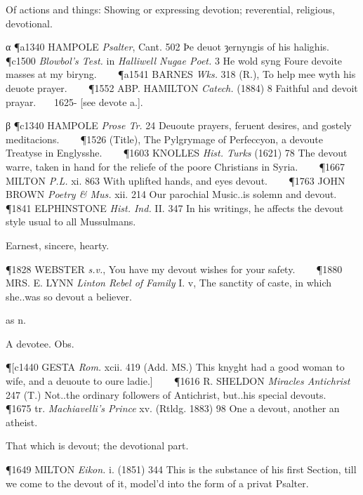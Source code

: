 \begin{description}[wide, labelwidth=!, labelindent=0pt]
\begin{myenumerate}
 Of actions and things: Showing or expressing devotion; reverential, religious, devotional.

α \P a1340 HAMPOLE  \textit{Psalter}, Cant. 502 Þe deuot ȝernyngis of his halighis.    
\P c1500 \textit{Blowbol's Test.} in  \textit{Halliwell Nugae Poet.} 3 He wold syng Foure devoite masses at my biryng.    
\P a1541 BARNES  \textit{Wks.} 318 (R.), To help mee wyth his deuote prayer.    
\P 1552 ABP. HAMILTON  \textit{Catech.} (1884) 8 Faithful and devoit prayar.    1625- [see devote a.].

β \P c1340 HAMPOLE  \textit{Prose Tr.} 24 Deuoute prayers, feruent desires, and gostely meditacions.    
\P 1526 (Title),  The Pylgrymage of Perfeccyon, a devoute Treatyse in Englysshe.    
\P 1603 KNOLLES  \textit{Hist. Turks} (1621) 78 The devout warre, taken in hand for the reliefe of the poore Christians in Syria.    
\P 1667 MILTON  \textit{P.L.} xi. 863 With uplifted hands, and eyes devout.    
\P 1763 JOHN  BROWN \textit{Poetry \& Mus.} xii. 214 Our parochial Music..is solemn and devout.    
\P 1841 ELPHINSTONE  \textit{Hist. Ind.} II. 347 In his writings, he affects the devout style usual to all Mussulmans.

 Earnest, sincere, hearty.

\P 1828 WEBSTER  \textit{s.v.}, You have my devout wishes for your safety.    
\P 1880 MRS. E. LYNN  \textit{Linton Rebel of Family} I. v, The sanctity of caste, in which she..was so devout a believer.

 as n.

 A devotee. Obs.

\P [c1440 GESTA  \textit{Rom.} xcii. 419 (Add. MS.) This knyght had a good woman to wife, and a deuoute to oure ladie.]    
\P 1616 R. SHELDON  \textit{Miracles Antichrist} 247 (T.) Not..the ordinary followers of Antichrist, but..his special devouts.    
\P 1675 tr.  \textit{Machiavelli's Prince} xv. (Rtldg. 1883) 98 One a devout, another an atheist.

 That which is devout; the devotional part.

\P 1649 MILTON  \textit{Eikon.} i. (1851) 344 This is the substance of his first Section, till we come to the devout of it, model'd into the form of a privat Psalter.
\end{myenumerate}



\end{description}
